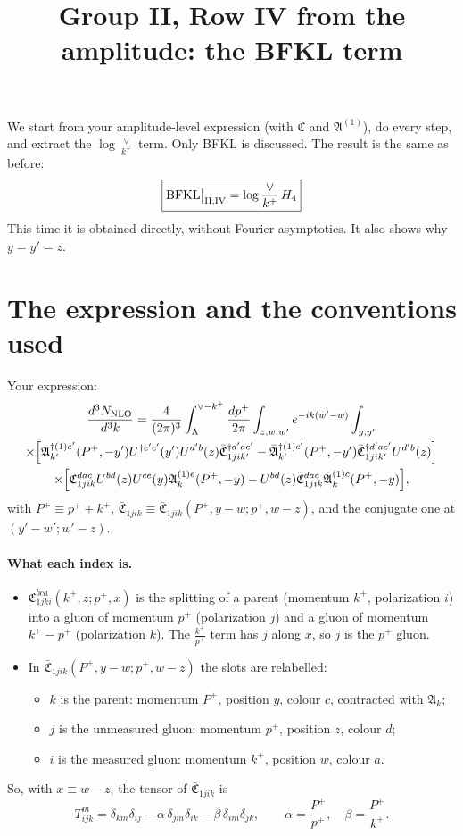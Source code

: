 \documentclass[10pt]{article}
\title{Group II, Row IV from the amplitude: the BFKL term}
\date{}
\numberwithin{equation}{section}
\newcommand{\mf}[1]{\mathfrak{#1}}
\newcommand{\NLO}[1]{\frac{d^3N_{#1}}{d^3k}}
\begin{document}
\maketitle
\noindent We start from your amplitude-level expression (with $\mf C$ and $\mf A^{(1)}$), do every step, and extract the $\log\frac{\vee}{k^+}$ term. Only BFKL is discussed. The result is the same as before:
\begin{equation*}
\boxed{\text{BFKL}\big|_{\rm II,IV}=\log\frac{\vee}{k^+}\,H_4}
\end{equation*}
This time it is obtained directly, without Fourier asymptotics. It also shows why $y=y'=z$.

\section{The expression and the conventions used}
Your expression:
\begin{multline}
\NLO{\rm NLO}=\frac{4}{(2\pi)^{3}}\int_{\Lambda}^{\vee-k^{+}}\frac{dp^{+}}{2\pi}\int_{z,w,w'}e^{-ik(w'-w)}\int_{y,y'}\\
\times\Big[\mf A^{\dagger(1)e'}_{k'}(P^+,-y')U^{\dagger e'c'}(y')U^{d'b}(z)\bar{\mf C}^{\dagger d'ac'}_{1jik'}-\bar{\mf A}^{\dagger(1)c'}_{k'}(P^+,-y')\bar{\mf C}^{\dagger d'ac'}_{1jik'}U^{d'b}(z)\Big]\\
\times\Big[\bar{\mf C}^{dac}_{1jik}U^{bd}(z)U^{ce}(y)\mf A^{(1)e}_{k}(P^+,-y)-U^{bd}(z)\bar{\mf C}^{dac}_{1jik}\bar{\mf A}^{(1)c}_{k}(P^+,-y)\Big],
\end{multline}
with $P^+\equiv p^++k^+$, $\bar{\mf C}_{1jik}\equiv\bar{\mf C}_{1jik}(P^+,y-w;p^+,w-z)$, and the conjugate one at $(y'-w';w'-z)$.

\paragraph{What each index is.}
\begin{itemize}
\item $\mf C^{bca}_{1jki}(k^+,z;p^+,x)$ is the splitting of a parent (momentum $k^+$, polarization $i$) into a gluon of momentum $p^+$ (polarization $j$) and a gluon of momentum $k^+-p^+$ (polarization $k$). The $\frac{k^+}{p^+}$ term has $j$ along $x$, so $j$ is the $p^+$ gluon.
\item In $\bar{\mf C}_{1jik}(P^+,y-w;p^+,w-z)$ the slots are relabelled:
\begin{itemize}
\item $k$ is the parent: momentum $P^+$, position $y$, colour $c$, contracted with $\mf A_k$;
\item $j$ is the unmeasured gluon: momentum $p^+$, position $z$, colour $d$;
\item $i$ is the measured gluon: momentum $k^+$, position $w$, colour $a$.
\end{itemize}
\end{itemize}
So, with $x\equiv w-z$, the tensor of $\bar{\mf C}_{1jik}$ is
\begin{equation}
T^{m}_{ijk}=\delta_{km}\delta_{ij}-\alpha\,\delta_{jm}\delta_{ik}-\beta\,\delta_{im}\delta_{jk},\qquad \alpha=\frac{P^+}{p^+},\quad\beta=\frac{P^+}{k^+}.
\end{equation}
\end{document}
